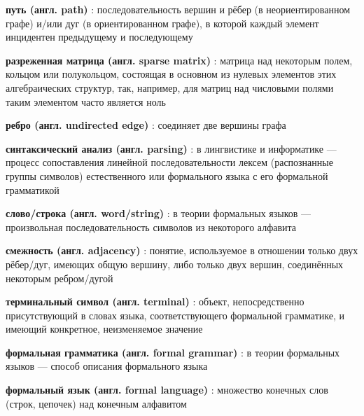 \textbf{путь (англ. path)} : последовательность вершин и рёбер (в неориентированном графе) и/или дуг (в ориентированном графе), в которой каждый элемент инцидентен предыдущему и последующему

\textbf{разреженная матрица (англ. sparse matrix)} : матрица над некоторым полем, кольцом или полукольцом, состоящая в основном из нулевых элементов этих алгебраических структур, так, например, для матриц над числовыми полями таким элементом часто является ноль

\textbf{ребро (англ. undirected edge)} : соединяет две вершины графа

\textbf{синтаксический анализ (англ. parsing)} : в лингвистике и информатике --- процесс сопоставления линейной последовательности лексем (распознанные группы символов) естественного или формального языка с его формальной грамматикой

\textbf{слово/строка (англ. word/string)} : в теории формальных языков --- произвольная последовательность символов из некоторого алфавита

\textbf{смежность (англ. adjacency)} : понятие, используемое в отношении только двух рёбер/дуг, имеющих общую вершину, либо только двух вершин, соединённых некоторым ребром/дугой

\textbf{терминальный символ (англ. terminal)} : объект, непосредственно присутствующий в словах языка, соответствующего формальной грамматике, и имеющий конкретное, неизменяемое значение

\textbf{формальная грамматика (англ. formal grammar)} : в теории формальных языков --- способ описания формального языка

\textbf{формальный язык (англ. formal language)} : множество конечных слов (строк, цепочек) над конечным алфавитом




































